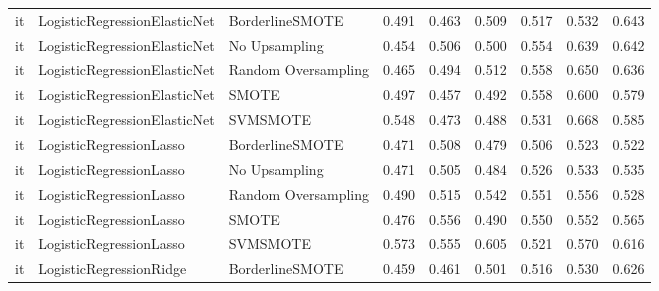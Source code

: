 \begin{tabular}{lllllllll}
      it & LogisticRegressionElasticNet &     BorderlineSMOTE & 0.491 &                     0.463 &                 0.509 &                  0.517 &                                   0.532 &     0.643 \\
      it & LogisticRegressionElasticNet &       No Upsampling & 0.454 &                     0.506 &                 0.500 &                  0.554 &                                   0.639 &     0.642 \\
      it & LogisticRegressionElasticNet & Random Oversampling & 0.465 &                     0.494 &                 0.512 &                  0.558 &                                   0.650 &     0.636 \\
      it & LogisticRegressionElasticNet &               SMOTE & 0.497 &                     0.457 &                 0.492 &                  0.558 &                                   0.600 &     0.579 \\
      it & LogisticRegressionElasticNet &            SVMSMOTE & 0.548 &                     0.473 &                 0.488 &                  0.531 &                                   0.668 &     0.585 \\
      it &      LogisticRegressionLasso &     BorderlineSMOTE & 0.471 &                     0.508 &                 0.479 &                  0.506 &                                   0.523 &     0.522 \\
      it &      LogisticRegressionLasso &       No Upsampling & 0.471 &                     0.505 &                 0.484 &                  0.526 &                                   0.533 &     0.535 \\
      it &      LogisticRegressionLasso & Random Oversampling & 0.490 &                     0.515 &                 0.542 &                  0.551 &                                   0.556 &     0.528 \\
      it &      LogisticRegressionLasso &               SMOTE & 0.476 &                     0.556 &                 0.490 &                  0.550 &                                   0.552 &     0.565 \\
      it &      LogisticRegressionLasso &            SVMSMOTE & 0.573 &                     0.555 &                 0.605 &                  0.521 &                                   0.570 &     0.616 \\
      it &      LogisticRegressionRidge &     BorderlineSMOTE & 0.459 &                     0.461 &                 0.501 &                  0.516 &                                   0.530 &     0.626 \\

\end{tabular}
